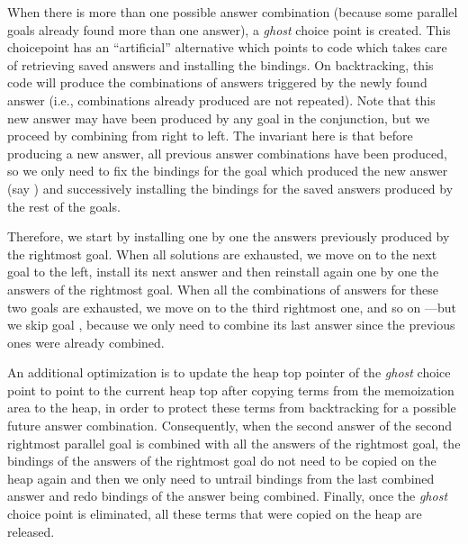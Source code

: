 \documentclass{tlp}
\begin{document}
When there is more than one possible answer combination (because some
parallel goals already found more than one answer), a \emph{ghost}
choice point is created.
This choicepoint has an ``artificial'' alternative which points to
code which takes care of retrieving saved answers and installing the
bindings. 
On backtracking, this code will produce the combinations of answers
triggered by the newly found answer (i.e., combinations already
produced are not repeated).  Note that this new answer may have been
produced by any goal in the conjunction, but we proceed by combining
from right to left.  The invariant here is that before producing a new
answer, all previous answer combinations have been produced, so we
only need to fix the bindings for the goal which produced the new
answer (say ) and successively installing the bindings for the
saved answers produced by the rest of the goals.

Therefore, we start by installing one by one the answers previously
produced by the rightmost goal.
When all solutions are exhausted, we move on to the next goal to the
left, install its next answer and then reinstall again one by one
the answers of the rightmost goal.  When all the combinations of
answers for these two goals are exhausted, we move on to the third
rightmost one, and so on ---but we skip goal , because we only need
to combine its last answer since the previous ones were already
combined.



An additional optimization
is to update the heap top
pointer of the \emph{ghost} choice point to point to the current heap
top after copying terms from the memoization area to the heap, in
order to protect these terms from backtracking for a possible future
answer combination.  Consequently, when the second answer of the
second rightmost parallel goal is combined with all the answers of the
rightmost goal, the bindings of the answers of the rightmost goal do
not need to be copied on the heap again and then we only need to
untrail bindings from the last combined answer and redo bindings of
the answer being combined.  Finally, once the \emph{ghost} choice
point is eliminated, all these terms that were copied on the heap are
released.
\end{document}
